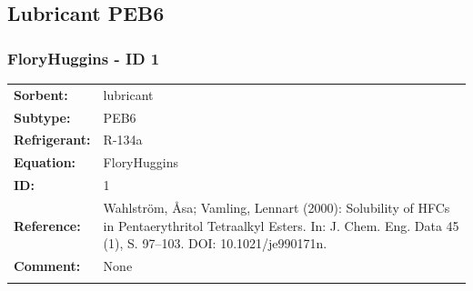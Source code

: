 \subsection{Lubricant PEB6}
%
\subsubsection{FloryHuggins - ID 1}
%
\begin{tabular}[l]{|lp{11.5cm}|}
\hline
\addlinespace

\textbf{Sorbent:} & lubricant \\
\textbf{Subtype:} & PEB6 \\
\textbf{Refrigerant:} & R-134a \\
\textbf{Equation:} & FloryHuggins \\
\textbf{ID:} & 1 \\
\textbf{Reference:} & Wahlström, Åsa; Vamling, Lennart (2000): Solubility of HFCs in Pentaerythritol Tetraalkyl Esters. In: J. Chem. Eng. Data 45 (1), S. 97–103. DOI: 10.1021/je990171n. \\
\textbf{Comment:} & None \\

\addlinespace
\hline
\end{tabular}
\newline

